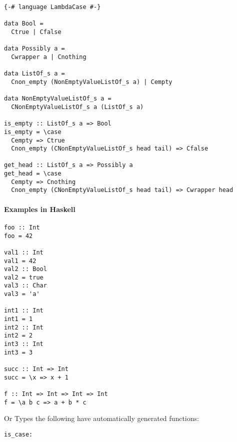 \documentclass{article}
\def\H{Haskell}
\def\pend{\mbox{} \\\\}
\begin{document}
\begin{verbatim}
{-# language LambdaCase #-}

data Bool =
  Ctrue | Cfalse

data Possibly a =
  Cwrapper a | Cnothing

data ListOf_s a =
  Cnon_empty (NonEmptyValueListOf_s a) | Cempty

data NonEmptyValueListOf_s a =
  CNonEmptyValueListOf_s a (ListOf_s a)

is_empty :: ListOf_s a => Bool
is_empty = \case
  Cempty => Ctrue
  Cnon_empty (CNonEmptyValueListOf_s head tail) => Cfalse

get_head :: ListOf_s a => Possibly a
get_head = \case
  Cempty => Cnothing
  Cnon_empty (CNonEmptyValueListOf_s head tail) => Cwrapper head
\end{verbatim}

\paragraph{Examples in \H}
\begin{verbatim}
foo :: Int
foo = 42

val1 :: Int
val1 = 42
val2 :: Bool
val2 = true
val3 :: Char
val3 = 'a'

int1 :: Int
int1 = 1
int2 :: Int
int2 = 2
int3 :: Int
int3 = 3

succ :: Int => Int
succ = \x => x + 1

f :: Int => Int => Int => Int
f = \a b c => a + b * c
\end{verbatim}

Or Types the following have automatically generated functions:

\begin{verbatim}
is_case:
\end{verbatim}

%


%
\end{document}
